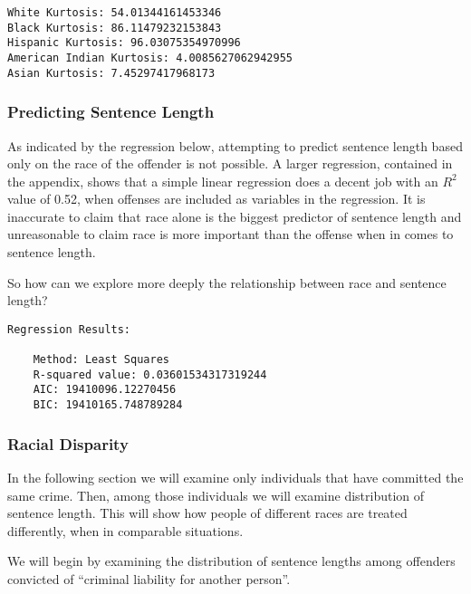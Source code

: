 \documentclass[11pt]{article}
\begin{document}
    \begin{Verbatim}[commandchars=\\\{\}]
White Kurtosis: 54.01344161453346
Black Kurtosis: 86.11479232153843
Hispanic Kurtosis: 96.03075354970996
American Indian Kurtosis: 4.0085627062942955
Asian Kurtosis: 7.45297417968173

    \end{Verbatim}

    \hypertarget{predicting-sentence-length}{%
\subsubsection{Predicting Sentence
Length}\label{predicting-sentence-length}}

As indicated by the regression below, attempting to predict sentence
length based only on the race of the offender is not possible. A larger
regression, contained in the appendix, shows that a simple linear
regression does a decent job with an \(R^2\) value of 0.52, when
offenses are included as variables in the regression. It is inaccurate
to claim that race alone is the biggest predictor of sentence length and
unreasonable to claim race is more important than the offense when in
comes to sentence length.

So how can we explore more deeply the relationship between race and
sentence length?

    \begin{Verbatim}[commandchars=\\\{\}]
Regression Results:

	Method: Least Squares
	R-squared value: 0.03601534317319244
	AIC: 19410096.12270456
	BIC: 19410165.748789284

    \end{Verbatim}

    \hypertarget{racial-disparity}{%
\subsubsection{Racial Disparity}\label{racial-disparity}}

In the following section we will examine only individuals that have
committed the same crime. Then, among those individuals we will examine
distribution of sentence length. This will show how people of different
races are treated differently, when in comparable situations.

We will begin by examining the distribution of sentence lengths among
offenders convicted of ``criminal liability for another person''.
\end{document}
